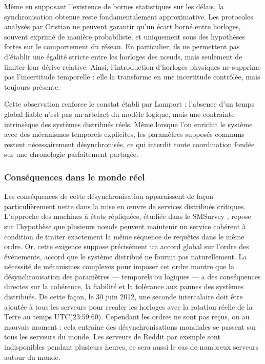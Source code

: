 \documentclass[12pt,a4paper]{article}
\begin{document}
\vspace{0.25cm}

Même en supposant l’existence de bornes statistiques sur les délais, la synchronisation obtenue reste fondamentalement approximative. Les protocoles analysés par Cristian ne peuvent garantir qu’un écart borné entre horloges, souvent exprimé de manière probabiliste, et uniquement sous des hypothèses fortes sur le comportement du réseau. En particulier, ils ne permettent pas d’établir une égalité stricte entre les horloges des nœuds, mais seulement de limiter leur dérive relative. Ainsi, l’introduction d’horloges physiques ne supprime pas l’incertitude temporelle : elle la transforme en une incertitude contrôlée, mais toujours présente.

\vspace{0.25cm}

Cette observation renforce le constat établi par Lamport : l’absence d’un temps global fiable n’est pas un artefact du modèle logique, mais une contrainte intrinsèque des systèmes distribués réels. Même lorsque l’on enrichit le système avec des mécanismes temporels explicites, les paramètres supposés communs restent nécessairement désynchronisés, ce qui interdit toute coordination fondée sur une chronologie parfaitement partagée.

\subsubsection{Conséquences dans le monde réel}

Les conséquences de cette désynchronisation apparaissent de façon particulièrement nette dans la mise en œuvre de services distribués critiques. L’approche des machines à états répliquées, étudiée dans le SMSurvey \cite{Schneider1990}, repose sur l’hypothèse que plusieurs nœuds peuvent maintenir un service cohérent à condition de traiter exactement la même séquence de requêtes dans le même ordre. Or, cette exigence suppose précisément un accord global sur l’ordre des événements, accord que le système distribué ne fournit pas naturellement. La nécessité de mécanismes complexes pour imposer cet ordre montre que la désynchronisation des paramètres — temporels ou logiques — a des conséquences directes sur la cohérence, la fiabilité et la tolérance aux pannes des systèmes distribués. De cette façon, le 30 juin 2012, une seconde intercalaire doit être ajoutée à tous les serveurs pour recaler les horloges avec la rotation réelle de la Terre au temps UTC(23:59:60). Cependant les ordres ne sont pas reçus, ou au mauvais moment : cela entraîne des désynchronisations mondiales se passent sur tous les serveurs du monde. Les serveurs de Reddit par exemple sont indisponibles pendant plusieurs heures, ce sera aussi le cas de nombreux serveurs autour du monde.
\end{document}
